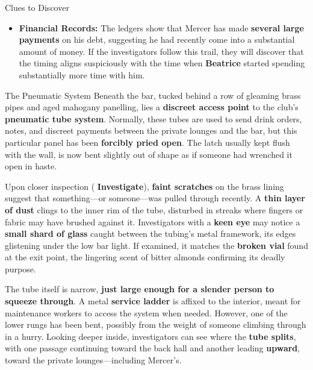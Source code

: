 \begin{CommentBox}{Clues to Discover}  
	\begin{itemize}  
		\item \textbf{Financial Records:} The ledgers show that Mercer has made \textbf{several large payments} on his debt, suggesting he had recently come into a substantial amount of money. If the investigators follow this trail, they will discover that the timing aligns suspiciously with the time when \textbf{Beatrice} started spending substantially more time with him.  
	\end{itemize}  
\end{CommentBox}  

\begin{Example}{The Pneumatic System}
	Beneath the bar, tucked behind a row of gleaming brass pipes and aged mahogany panelling, lies a \textbf{discreet access point} to the club’s \textbf{pneumatic tube system}. Normally, these tubes are used to send drink orders, notes, and discreet payments between the private lounges and the bar, but this particular panel has been \textbf{forcibly pried open}. The latch usually kept flush with the wall, is now bent slightly out of shape as if someone had wrenched it open in haste.  

	Upon closer inspection ( \textbf{Investigate}), \textbf{faint scratches} on the brass lining suggest that something—or someone—was pulled through recently. A \textbf{thin layer of dust} clings to the inner rim of the tube, disturbed in streaks where fingers or fabric may have brushed against it. Investigators with a \textbf{keen eye} may notice a \textbf{small shard of glass} caught between the tubing's metal framework, its edges glistening under the low bar light. If examined, it matches the \textbf{broken vial} found at the exit point, the lingering scent of bitter almonds confirming its deadly purpose.  

	The tube itself is narrow, \textbf{just large enough for a slender person to squeeze through}. A metal \textbf{service ladder} is affixed to the interior, meant for maintenance workers to access the system when needed. However, one of the lower rungs has been bent, possibly from the weight of someone climbing through in a hurry. Looking deeper inside, investigators can see where the \textbf{tube splits}, with one passage continuing toward the back hall and another leading \textbf{upward}, toward the private lounges—including Mercer’s.  	
\end{Example}
